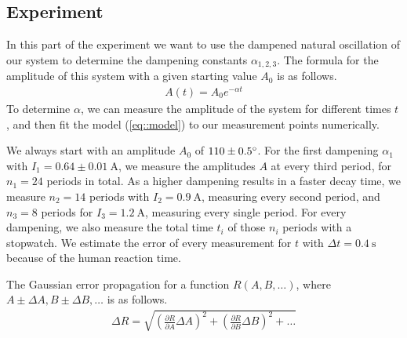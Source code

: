 \subsection{Experiment}
In this part of the experiment we want to use the dampened natural oscillation of our system to determine the dampening constants $\alpha_{1, 2, 3}$.
The formula for the amplitude of this system with a given starting value $A_0$ is  as follows.
\begin{align}
	A(t) = A_0 e^{-\alpha t}
	\label{eq::model}
\end{align} 
To determine $\alpha$, we can measure the amplitude of the system for different times $t$, and then fit the model (\ref{eq::model}) to our measurement points numerically.

We always start with an amplitude $A_0$ of $110 \pm 0.5 \degree$.
For the first dampening $\alpha_1$ with $I_1 = 0.64 \pm \SI{0.01}{\ampere}$, we measure the amplitudes $A$ at every third period, for $n_1 = 24$ periods in total.
As a higher dampening results in a faster decay time, we measure $n_2 = 14$ periods with $I_2 = \SI{0.9}{\ampere}$, measuring every second period, and $n_3 = 8$ periods for $I_3 = \SI{1.2}{\ampere}$, measuring every single period.
For every dampening, we also measure the total time $t_i$ of those $n_i$ periods with a stopwatch. We estimate the error of every measurement for $t$ with $\Delta t = \SI{0.4}{\second}$ because of the human reaction time.


The Gaussian error propagation for a function $R(A, B, \dots)$, where $A \pm \Delta A, B \pm \Delta B, \dots$ is as follows.
\begin{align}
	\Delta R = \sqrt{\left(\frac{\partial R}{\partial A} \Delta A\right)^2 + \left(\frac{\partial R}{\partial B} \Delta B\right)^2 + \dots}
	\label{eq::gauss}
\end{align}
